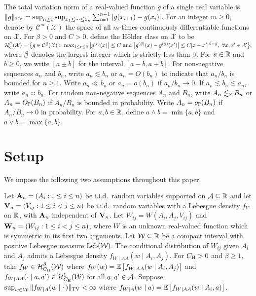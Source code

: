 The total variation norm of a
real-valued function $g$ of a single real variable is
$\|g\|_\TV = \sup_{n \geq 1} \sup_{x_1 \leq \cdots \leq x_n}
\sum_{i=1}^{n-1} |g(x_{i+1}) - g(x_i)|$.
For an integer $m\geq 0$,
denote by $\mathcal{C}^m(\mathcal{X})$
the space of all $m$-times continuously differentiable functions
on $\mathcal{X}$.
For $\beta > 0$ and $C>0$,
define the H\"{o}lder class on $\mathcal{X}$ to be
$\cH^\beta_C(\cX)
=
\big\{
g \in \cC^{\flbeta}(\cX): \
\max_{1 \leq r \leq \flbeta}
\big| g^{(r)}(x) \big| \leq C
\text{ and }
\big| g^{(\flbeta)}(x) - g^{(\flbeta)}(x') \big|
\leq C |x-x'|^{\beta - \flbeta}, \
\forall x, x' \in \cX
\big\},
$
where $\flbeta$ denotes the largest integer
which is strictly less than $\beta$.
For $a \in \R$ and $b \geq 0$,
we write $[a \pm b]$ for the interval $[a-b, a+b]$.
For non-negative sequences
$a_n$ and $b_n$, write
$a_n \lesssim b_n$ or $a_n = O(b_n)$
to indicate that
$a_n / b_n$ is bounded for $n\geq 1$.
Write $a_n \ll b_n$ or $a_n = o(b_n)$ if $a_n / b_n \to 0$.
If $a_n \lesssim b_n \lesssim a_n$,
write $a_n \asymp b_n$.
For random non-negative sequences
$A_n$ and $B_n$, write
$A_n \lesssim_\P B_n$ or $A_n = O_\P(B_n)$ if
$A_n / B_n$ is bounded in probability.
Write $A_n = o_\P(B_n)$ if $A_n / B_n \to 0$ in probability.
For $a,b \in \R$, define $a\wedge b=\min\{a,b\}$ and
$a \vee b = \max\{a,b\}$.

\section{Setup}\label{sec:kernel_setup}

We impose the following two assumptions throughout this paper.
%
\begin{assumption}[Data generation]\label{ass:kernel_data}\onehalfspacing
  Let $\bA_n = (A_i: 1 \leq i \leq n)$ be i.i.d.\
  random variables supported on $\cA \subseteq \R$
  and let $\bV_n = (V_{ij}: 1 \leq i < j \leq n)$
  be i.i.d.\ random variables with a Lebesgue density $f_V$ on $\R$,
  with $\bA_n$ independent of $\bV_n$.
  Let $W_{ij} = W(A_i, A_j, V_{ij})$
  and $\bW_n = (W_{ij}: 1 \leq i < j \leq n)$,
  where $W$ is an unknown real-valued function
  which is symmetric in its first two arguments.
  Let $\cW \subseteq \R$ be a compact interval
  with positive Lebesgue measure $\Leb(\cW)$.
  The conditional distribution
  of $W_{ij}$ given $A_i$ and $A_j$
  admits a Lebesgue density $f_{W \mid AA}(w \mid A_i, A_j)$.
  For $\CH > 0$ and $\beta \geq 1$,
  take $f_W \in \cH^\beta_{\CH}(\cW)$ where
  $f_{W}(w) = \E\left[f_{W \mid AA}(w \mid A_i,A_j)\right]$
  and
  $f_{W \mid AA}(\cdot \mid a, a') \in \cH^1_{\CH}(\cW)$
  for all $a,a' \in \cA$.
  Suppose
  $\sup_{w \in \cW} \|f_{W \mid A}(w \mid \cdot\,)\|_\TV <\infty$ where
  $f_{W \mid A}(w \mid a) = \E\left[f_{W \mid AA}(w \mid A_i,a)\right]$.
\end{assumption}

